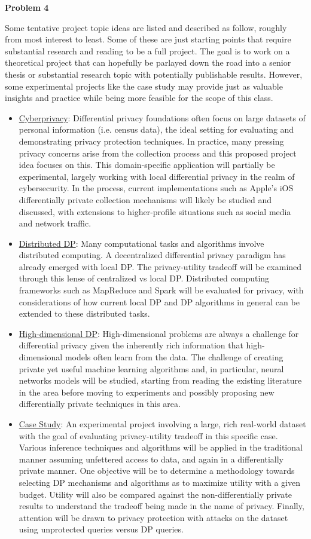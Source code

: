\documentclass[12pt]{article}
\begin{document}
\pagebreak

{\large\textbf{Problem 4}}

Some tentative project topic ideas are listed and described as follow, roughly from most interest to least. Some of these are just starting points that require substantial research and reading to be a full project. The goal is to work on a theoretical project that can hopefully be parlayed down the road into a senior thesis or substantial research topic with potentially publishable results. However, some experimental projects like the case study may provide just as valuable insights and practice while being more feasible for the scope of this class.
\begin{itemize}
	\item \ul{Cyberprivacy}: Differential privacy foundations often focus on large datasets of personal information (i.e. census data), the ideal setting for evaluating and demonstrating privacy protection techniques. In practice, many pressing privacy concerns arise from the collection process and this proposed project idea focuses on this. This domain-specific application will partially be experimental, largely working with local differential privacy in the realm of cybersecurity. In the process, current implementations such as Apple's iOS differentially private collection mechanisms will likely be studied and discussed, with extensions to higher-profile situations such as social media and network traffic.
	\item \ul{Distributed DP}: Many computational tasks and algorithms involve distributed computing. A decentralized differential privacy paradigm has already emerged with local DP. The privacy-utility tradeoff will be examined through this lense of centralized vs local DP. Distributed computing frameworks such as MapReduce and Spark will be evaluated for privacy, with considerations of how current local DP and DP algorithms in general can be extended to these distributed tasks.
	\item \ul{High-dimensional DP}: High-dimensional problems are always a challenge for differential privacy given the inherently rich information that high-dimensional models often learn from the data. The challenge of creating private yet useful machine learning algorithms and, in particular, neural networks models will be studied, starting from reading the existing literature in the area before moving to experiments and possibly proposing new differentially private techniques in this area.
	\item \ul{Case Study}: An experimental project involving a large, rich real-world dataset with the goal of evaluating privacy-utility tradeoff in this specific case. Various inference techniques and algorithms will be applied in the traditional manner assuming unfettered access to data, and again in a differentially private manner. One objective will be to determine a methodology towards selecting DP mechanisms and algorithms as to maximize utility with a given budget. Utility will also be compared against the non-differentially private results to understand the tradeoff being made in the name of privacy. Finally, attention will be drawn to privacy protection with attacks on the dataset using unprotected queries versus DP queries.

\end{itemize}
\end{document}
